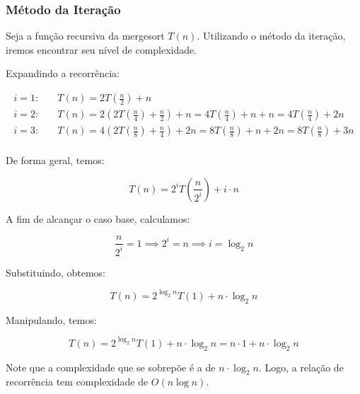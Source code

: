 \subsubsection{Método da Iteração}
Seja a função recursiva da mergesort \( T(n) \). Utilizando o método da iteração, iremos encontrar seu nível de complexidade. 

Expandindo a recorrência:

\begin{align*}
i = 1 : &\quad T(n) = 2T\left(\frac{n}{2}\right) + n \\
i = 2 : &\quad T(n) = 2\left(2T\left(\frac{n}{4}\right) + \frac{n}{2}\right) + n = 4T\left(\frac{n}{4}\right) + n + n = 4T\left(\frac{n}{4}\right) + 2n\\
i = 3 : &\quad T(n) = 4\left(2T\left(\frac{n}{8}\right) + \frac{n}{4}\right) + 2n = 8T\left(\frac{n}{8}\right) + n + 2n = 8T\left(\frac{n}{8}\right) + 3n\\
\end{align*}

De forma geral, temos:

\[
T(n) = 2^i T\left(\frac{n}{2^i}\right) + i \cdot n
\]

A fim de alcançar o caso base, calculamos:

\[
\frac{n}{2^i} = 1 \implies 2^i = n \implies i = \log_{2}{n}
\]

Substituindo, obtemos:

\[
T(n) = 2^{\log_{2}{n}} T(1) + n \cdot \log_{2}{n}
\]

Manipulando, temos:

\[
T(n) = 2^{\log_{2}{n}} T(1) + n \cdot \log_{2}{n} = n \cdot 1 + n \cdot \log_{2}{n}
\]

Note que a complexidade que se sobrepõe é a de \( n \cdot \log_{2}{n} \). Logo, a relação de recorrência tem complexidade de \( O(n \log n) \).
